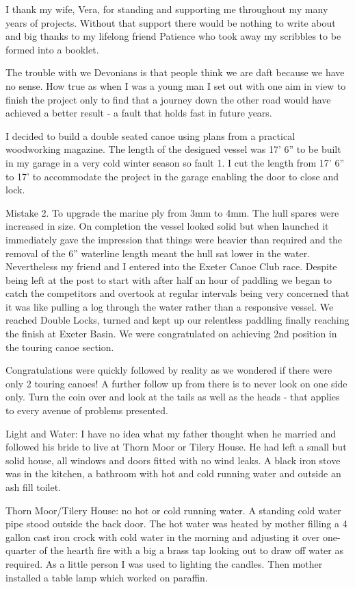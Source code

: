 I thank my wife, Vera, for standing and supporting me throughout my many years
of projects. Without that support there would be nothing to write about and big
thanks to my lifelong friend Patience who took away my scribbles to be formed
into a booklet.

The trouble with we Devonians is that people think we are daft because we have
no sense.  How true as when I was a young man I set out with one aim in view to
finish the project only to find that a journey down the other road would have
achieved a better result - a fault that holds fast in future years.

I decided to build a double seated canoe using plans from a practical
woodworking magazine.  The length of the designed vessel was 17' 6'' to be
built in my garage in a very cold winter season so fault 1.  I cut the length
from 17' 6'' to 17' to accommodate the project in the garage enabling the door
to close and lock.

Mistake 2.  To upgrade the marine ply from 3mm to 4mm.  The hull spares were
increased in size.  On completion the vessel looked solid but when launched it
immediately gave the impression that things were heavier than required and the
removal of the 6'' waterline length meant the hull sat lower in the water.
Nevertheless my friend and I entered into the Exeter Canoe Club race.   Despite
being left at the post to start with after half an hour of paddling we began to
catch the competitors and overtook at regular intervals being very concerned
that it was like pulling a log through the water rather than a responsive
vessel.  We reached Double Locks, turned and kept up our relentless paddling
finally reaching the finish at Exeter Basin.  We were congratulated on
achieving 2nd position in the touring canoe section.

Congratulations were quickly followed by reality as we wondered if there were
only 2 touring canoes!  A further follow up from there is to never look on one
side only.  Turn the coin over and look at the tails as well as the heads -
that applies to every avenue of problems presented.

Light and Water:  I have no idea what my father thought when he married and
followed his bride to live at Thorn Moor or Tilery House.  He had left a small
but solid house, all windows and doors fitted with no wind leaks.  A black iron
stove was in the kitchen, a bathroom with hot and cold running water and
outside an ash fill toilet.

Thorn Moor/Tilery House: no hot or cold running water.  A standing cold water
pipe stood outside the back door.  The hot water was heated by mother filling a
4 gallon cast iron crock with cold water in the morning and adjusting it over
one-quarter of the hearth fire with a big a brass tap looking out to draw off
water as required.   As a little person I was used to lighting the candles.
Then mother installed a table lamp which worked on paraffin.

